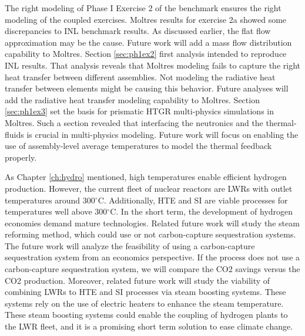 The right modeling of Phase I Exercise 2 of the benchmark ensures the right modeling of the coupled exercises.
Moltres results for exercise 2a showed some discrepancies to INL benchmark results.
As discussed earlier, the flat flow approximation may be the cause.
Future work will add a mass flow distribution capability to Moltres.
Section \ref{sec:ph1ex2} first analysis intended to reproduce INL results.
That analysis reveals that Moltres modeling fails to capture the right heat transfer between different assemblies.
Not modeling the radiative heat transfer between elements might be causing this behavior.
Future analyses will add the radiative heat transfer modeling capability to Moltres.
Section \ref{sec:ph1ex3} set the basis for prismatic HTGR multi-physics simulations in Moltres.
Such a section revealed that interfacing the neutronics and the thermal-fluids is crucial in multi-physics modeling. 
Future work will focus on enabling the use of assembly-level average temperatures to model the thermal feedback properly.


As Chapter \ref{ch:hydro} mentioned, high temperatures enable efficient hydrogen production.
However, the current fleet of nuclear reactors are LWRs with outlet temperatures around 300$^{\circ}$C.
Additionally, HTE and SI are viable processes for temperatures well above 300$^{\circ}$C.
In the short term, the development of hydrogen economies demand mature technologies.
Related future work will study the steam reforming method, which could use or not carbon-capture sequestration systems.
The future work will analyze the feasibility of using a carbon-capture sequestration system from an economics perspective.
If the process does not use a carbon-capture sequestration system, we will compare the \gls{CO2} savings versus the \gls{CO2} production.
Moreover, related future work will study the viability of combining LWRs to HTE and SI processes via steam boosting systems.
These systems rely on the use of electric heaters to enhance the steam temperature.
These steam boosting systems could enable the coupling of hydrogen plants to the LWR fleet, and it is a promising short term solution to ease climate change.

